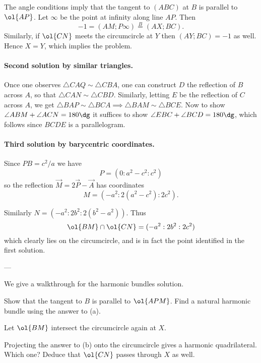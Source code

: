 The angle conditions imply that the tangent to $(ABC)$ at $B$
is parallel to $\ol{AP}$.
Let $\infty$ be the point at infinity along line $AP$.
Then \[ -1 = (AM;P\infty) \overset{B}{=} (AX;BC). \]
Similarly, if $\ol{CN}$ meets the circumcircle at $Y$
then $(AY;BC) = -1$ as well.
Hence $X=Y$, which implies the problem.

\paragraph{Second solution by similar triangles.}
Once one observes $\triangle CAQ \sim \triangle CBA$,
one can construct $D$ the reflection of $B$ across $A$,
so that $\triangle CAN \sim \triangle CBD$.
Similarly, letting $E$ be the reflection of $C$ across $A$,
we get $\triangle BAP \sim \triangle BCA
\implies \triangle BAM \sim \triangle BCE$.
Now to show $\angle ABM + \angle ACN = 180\dg$
it suffices to show $\angle EBC + \angle BCD = 180\dg$,
which follows since $BCDE$ is a parallelogram.

\paragraph{Third solution by barycentric coordinates.}
Since $PB = c^2/a$ we have
\[ P = (0 : a^2-c^2 : c^2) \]
so the reflection $\vec M = 2\vec P - \vec A$ has coordinates
\[ M = (-a^2 : 2(a^2-c^2) : 2c^2). \]

Similarly $N = (-a^2 : 2b^2 : 2(b^2-a^2))$. Thus
\[ \ol{BM} \cap \ol{CN} = (-a^2 : 2b^2 : 2c^2) \]
which clearly lies on the circumcircle,
and is in fact the point identified in the first solution.

---

We give a walkthrough for the harmonic bundles solution.

\begin{walk}
  \ii Show that the tangent to $B$
  is parallel to $\ol{APM}$.
  \ii Find a natural harmonic bundle using the answer to (a).
\end{walk}
Let $\ol{BM}$ intersect the circumcircle again at $X$.
\begin{walk}[resume]
  \ii Projecting the answer to (b) onto the circumcircle
  gives a harmonic quadrilateral. Which one?
  \ii Deduce that $\ol{CN}$ passes through $X$ as well.
\end{walk}
